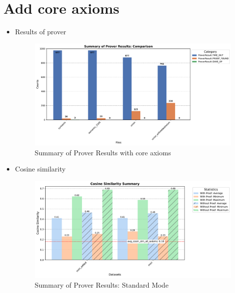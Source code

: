 \documentclass[english,version-2020-11]{uzl-thesis}
\begin{document}
    \section{Add core axioms}
      \begin{itemize}
        \item Results of prover
          \begin{figure}[h!]
            \centering
            \includegraphics[width=\textwidth]{standard_mode_output.pdf} %
            \caption{Summary of Prover Results with core axioms}
            \label{fig:prover_results_with_core_axioms}
          \end{figure}
        \item Cosine similarity
          \begin{figure}[h!]
            \centering
            \includegraphics[width=\textwidth]{cosine_similarity_mini_summary.pdf} %
            \caption{Summary of Prover Results: Standard Mode}
            \label{fig:prover_results_standard}
          \end{figure}
        \clearpage
      \end{itemize}
\end{document}
